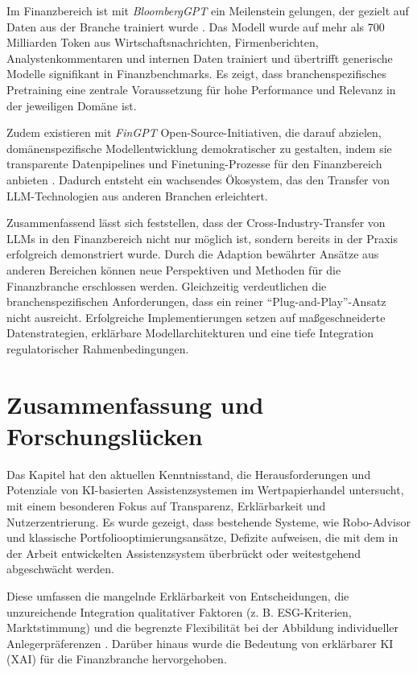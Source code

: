   Im Finanzbereich ist mit \textit{BloombergGPT} ein Meilenstein gelungen, der gezielt auf Daten aus der Branche trainiert wurde \autocite[S. 1-3]{wu2023}.
  Das Modell wurde auf mehr als 700 Milliarden Token aus Wirtschaftsnachrichten, Firmenberichten, Analystenkommentaren und internen Daten trainiert und übertrifft generische Modelle signifikant in Finanzbenchmarks.
  Es zeigt, dass branchenspezifisches Pretraining eine zentrale Voraussetzung für hohe Performance und Relevanz in der jeweiligen Domäne ist.

  Zudem existieren mit \textit{FinGPT} Open-Source-Initiativen, die darauf abzielen, domänenspezifische Modellentwicklung demokratischer zu gestalten, indem sie transparente Datenpipelines und Finetuning-Prozesse für den Finanzbereich anbieten \autocite[S. 1]{yang2023fingpt}.
  Dadurch entsteht ein wachsendes Ökosystem, das den Transfer von LLM-Technologien aus anderen Branchen erleichtert.

  Zusammenfassend lässt sich feststellen, dass der Cross-Industry-Transfer von \acs{LLM}s in den Finanzbereich nicht nur möglich ist, sondern bereits in der Praxis erfolgreich demonstriert wurde.
  Durch die Adaption bewährter Ansätze aus anderen Bereichen können neue Perspektiven und Methoden für die Finanzbranche erschlossen werden.
  Gleichzeitig verdeutlichen die branchenspezifischen Anforderungen, dass ein reiner \enquote{Plug-and-Play}-Ansatz nicht ausreicht.
  Erfolgreiche Implementierungen setzen auf maßgeschneiderte Datenstrategien, erklärbare Modellarchitekturen und eine tiefe Integration regulatorischer Rahmenbedingungen.


\section{Zusammenfassung und Forschungslücken}

  Das Kapitel hat den aktuellen Kenntnisstand, die Herausforderungen und Potenziale von KI-basierten Assistenzsystemen im Wertpapierhandel untersucht, mit einem besonderen Fokus auf Transparenz, Erklärbarkeit und Nutzerzentrierung.
  Es wurde gezeigt, dass bestehende Systeme, wie Robo-Advisor und klassische Portfoliooptimierungsansätze, Defizite aufweisen, die mit dem in der Arbeit entwickelten Assistenzsystem überbrückt oder weitestgehend abgeschwächt werden.

  Diese umfassen die mangelnde Erklärbarkeit von Entscheidungen, die unzureichende Integration qualitativer Faktoren (z. B. \acs{ESG}-Kriterien, Marktstimmung) und die begrenzte Flexibilität bei der Abbildung individueller Anlegerpräferenzen \autocite{hecker2017, demiguel2009}.
  Darüber hinaus wurde die Bedeutung von erklärbarer KI (\acs{XAI}) für die Finanzbranche hervorgehoben.

